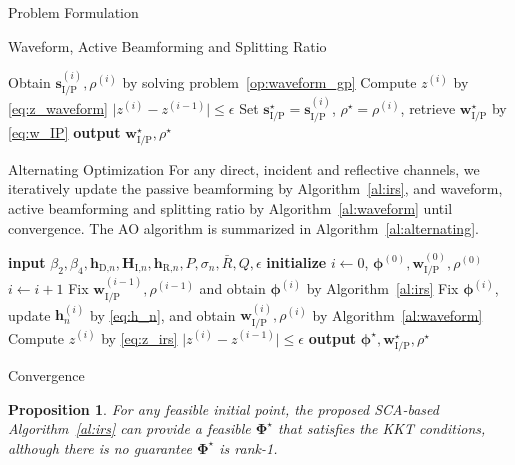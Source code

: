 \documentclass[journal]{IEEEtran}
\newtheorem{proposition}{Proposition}
\begin{document}
\begin{section}{Problem Formulation}
\begin{subsection}{Waveform, Active Beamforming and Splitting Ratio}
\begin{algorithm}[!t]
\begin{algorithmic}[1]
						\State Obtain $\boldsymbol{s}_{\text{I/P}}^{(i)},\rho^{(i)}$ by solving problem~\eqref{op:waveform_gp}
						\State Compute $z^{(i)}$ by \eqref{eq:z_waveform}
					\Until $\lvert z^{(i)} - z^{(i-1)} \rvert \le \epsilon$
					\State Set $\boldsymbol{s}_{\text{I/P}}^{\star}=\boldsymbol{s}_{\text{I/P}}^{(i)}$, $\rho^{\star}=\rho^{(i)}$, retrieve $\boldsymbol{w}_{\text{I/P}}^{\star}$ by \eqref{eq:w_IP}
					\State \textbf{output} $\boldsymbol{w}_{\text{I/P}}^{\star}, \rho^{\star}$
				\end{algorithmic}
			\end{algorithm}
		\end{subsection}


		\begin{subsection}{Alternating Optimization}
			For any direct, incident and reflective channels, we iteratively update the passive beamforming by Algorithm~\ref{al:irs}, and waveform, active beamforming and splitting ratio by Algorithm~\ref{al:waveform} until convergence. The AO algorithm is summarized in Algorithm~\ref{al:alternating}.
			\begin{algorithm}[!t]
				\caption{AO: Waveform, Active and Passive Beamforming.}
				\label{al:alternating}
				\begin{algorithmic}[1]
					\State \textbf{input} $\beta_2,\beta_4,\boldsymbol{h}_{\text{D,}n},\boldsymbol{H}_{\text{I,}n},\boldsymbol{h}_{\text{R,}n},P,\sigma_n,\bar{R},Q,\epsilon$
					\State \textbf{initialize} $i \gets 0$, $\boldsymbol{\phi}^{(0)},\boldsymbol{w}_{\text{I/P}}^{(0)},\rho^{(0)}$
					\Repeat
						\State $i \gets i + 1$
						\State Fix $\boldsymbol{w}_{\text{I/P}}^{(i-1)},\rho^{(i-1)}$ and obtain $\boldsymbol{\phi}^{(i)}$ by Algorithm~\ref{al:irs}
						\State Fix $\boldsymbol{\phi}^{(i)}$, update $\boldsymbol{h}_n^{(i)}$ by \eqref{eq:h_n}, and obtain $\boldsymbol{w}_{\text{I/P}}^{(i)}, \rho^{(i)}$ by Algorithm~\ref{al:waveform}
						\State Compute $z^{(i)}$ by \eqref{eq:z_irs}
					\Until $\lvert z^{(i)} - z^{(i-1)} \rvert \le \epsilon$
					\State \textbf{output} $\boldsymbol{\phi}^{\star}, \boldsymbol{w}_{\text{I/P}}^{\star}, \rho^{\star}$
				\end{algorithmic}
			\end{algorithm}
		\end{subsection}


		\begin{subsection}{Convergence}
			\begin{proposition}\label{pr:irs}
				For any feasible initial point, the proposed SCA-based Algorithm~\ref{al:irs} can provide a feasible $\boldsymbol{\Phi}^{\star}$ that satisfies the KKT conditions, although there is no guarantee $\boldsymbol{\Phi}^{\star}$ is rank-\num{1}.
			\end{proposition}


\end{subsection}
\end{section}
\end{document}
